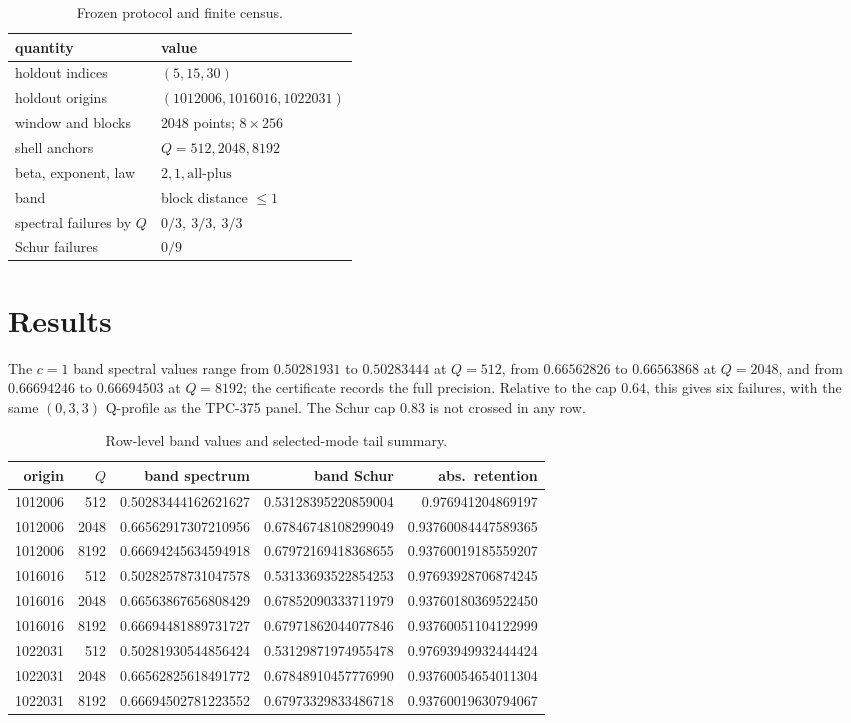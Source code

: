 \documentclass[10pt]{article}
\begin{document}
\begin{table}[ht]
\centering
\caption{Frozen protocol and finite census.}
\begin{tabular}{ll}
\toprule
quantity & value\\
\midrule
holdout indices & $(5,15,30)$\\
holdout origins & $(1012006,1016016,1022031)$\\
window and blocks & $2048$ points; $8\times256$\\
shell anchors & $Q=512,2048,8192$\\
beta, exponent, law & $2,1,\mathrm{all\text{-}plus}$\\
band & block distance $\leq1$\\
spectral failures by $Q$ & $0/3,\ 3/3,\ 3/3$\\
Schur failures & $0/9$\\
\bottomrule
\end{tabular}
\end{table}

\section{Results}

The $c=1$ band spectral values range from
$0.50281931$ to $0.50283444$ at $Q=512$,
from $0.66562826$ to $0.66563868$ at $Q=2048$,
and from $0.66694246$ to $0.66694503$ at $Q=8192$; the certificate records
the full precision.
Relative to the cap $0.64$, this gives six failures, with the same
$(0,3,3)$ Q-profile as the TPC-375 panel.  The Schur cap $0.83$ is not
crossed in any row.

\begin{table}[ht]
\centering
\caption{Row-level band values and selected-mode tail summary.}
\setlength{\tabcolsep}{2pt}
\scriptsize
\begin{tabular}{rrrrr}
\toprule
origin & $Q$ & band spectrum & band Schur & abs.\ retention\\
\midrule
1012006 & 512  & 0.50283444162621627 & 0.53128395220859004 & 0.976941204869197\\
1012006 & 2048 & 0.66562917307210956 & 0.67846748108299049 & 0.93760084447589365\\
1012006 & 8192 & 0.66694245634594918 & 0.67972169418368655 & 0.93760019185559207\\
1016016 & 512  & 0.50282578731047578 & 0.53133693522854253 & 0.97693928706874245\\
1016016 & 2048 & 0.66563867656808429 & 0.67852090333711979 & 0.93760180369522450\\
1016016 & 8192 & 0.66694481889731727 & 0.67971862044077846 & 0.93760051104122999\\
1022031 & 512  & 0.50281930544856424 & 0.53129871974955478 & 0.97693949932444424\\
1022031 & 2048 & 0.66562825618491772 & 0.67848910457776990 & 0.93760054654011304\\
1022031 & 8192 & 0.66694502781223552 & 0.67973329833486718 & 0.93760019630794067\\
\bottomrule
\end{tabular}
\end{table}
\end{document}
